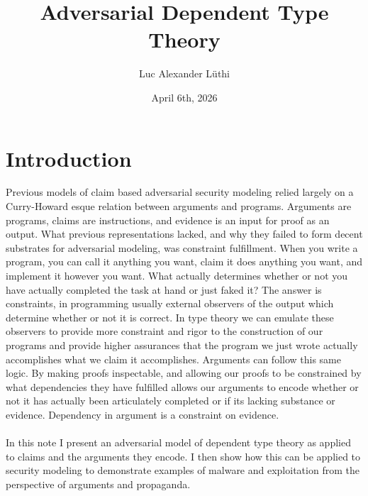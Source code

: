 \documentclass{article}
\title{Adversarial Dependent Type Theory}
\author{Luc Alexander L{\"u}thi}
\date{April 6th, 2026}
\begin{document}
	\maketitle
	\tableofcontents
	\section{Introduction}
	Previous models of claim based adversarial security modeling relied largely on a Curry-Howard esque relation between arguments and programs. Arguments are programs, claims are instructions, and evidence is an input for proof as an output. What previous representations lacked, and why they failed to form decent substrates for adversarial modeling, was constraint fulfillment. When you write a program, you can call it anything you want, claim it does anything you want, and implement it however you want. What actually determines whether or not you have actually completed the task at hand or just faked it? The answer is constraints, in programming usually external observers of the output which determine whether or not it is correct. In type theory we can emulate these observers to provide more constraint and rigor to the construction of our programs and provide higher assurances that the program we just wrote actually accomplishes what we claim it accomplishes. Arguments can follow this same logic. By making proofs inspectable, and allowing our proofs to be constrained by what dependencies they have fulfilled allows our arguments to encode whether or not it has actually been articulately completed or if its lacking substance or evidence. Dependency in argument is a constraint on evidence.\\\\
	In this note I present an adversarial model of dependent type theory as applied to claims and the arguments they encode. I then show how this can be applied to security modeling to demonstrate examples of malware and exploitation from the perspective of arguments and propaganda.
\end{document}
